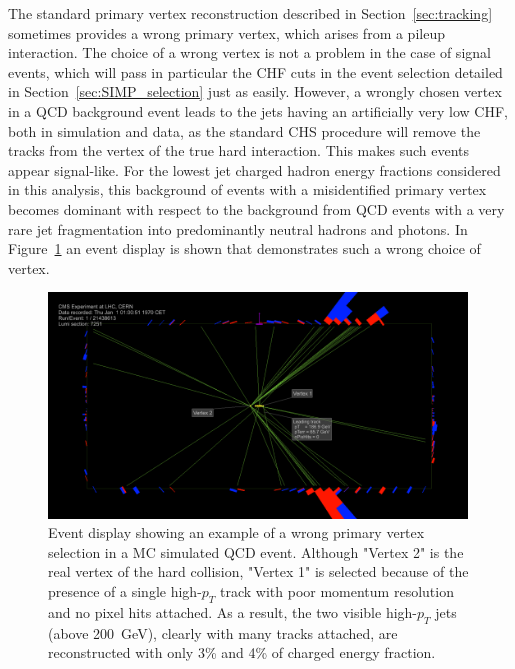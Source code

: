 The standard primary  vertex reconstruction described in Section~\ref{sec:tracking} sometimes provides a wrong primary vertex, which arises from a pileup interaction. The choice of a wrong vertex is not a problem in the case of signal events, which will pass in particular the CHF cuts in the event selection detailed in Section~\ref{sec:SIMP_selection} just as easily. However, a wrongly chosen vertex in a \ac{QCD} background event leads to the jets having an artificially very low CHF, both in simulation and data, as the standard \acf{CHS} procedure will remove the tracks from the vertex of the true hard interaction. This makes such events appear signal-like. For the lowest jet charged hadron energy fractions considered in this analysis, this background of events with a misidentified primary vertex becomes dominant with respect to the background from \ac{QCD} events with a very rare jet fragmentation into predominantly neutral hadrons and photons. In Figure~\ref{fig:wrongvertex} an event display is shown that demonstrates such a wrong choice of vertex.

\begin{figure}[ht]
  \centering
  \includegraphics[width=0.99\textwidth]{figures/wrongvertex.png}
  \caption{Event display showing an example of a wrong primary vertex selection in a MC simulated \ac{QCD} event. Although "Vertex 2" is the real vertex of the hard collision, "Vertex 1" is selected because of the presence of a single high-$p_T$ track with poor momentum resolution and no pixel hits attached. As a result, the two visible high-$p_T$ jets (above \SI{200}{GeV}), clearly with many tracks attached, are reconstructed with only 3\% and 4\% of charged energy fraction.}
  \label{fig:wrongvertex}
\end{figure} 

